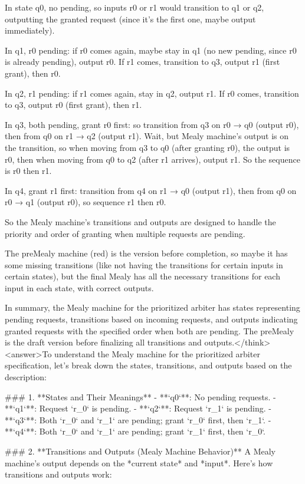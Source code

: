 In state q0, no pending, so inputs r0 or r1 would transition to q1 or q2, outputting the granted request (since it's the first one, maybe output immediately).

In q1, r0 pending: if r0 comes again, maybe stay in q1 (no new pending, since r0 is already pending), output r0. If r1 comes, transition to q3, output r1 (first grant), then r0.

In q2, r1 pending: if r1 comes again, stay in q2, output r1. If r0 comes, transition to q3, output r0 (first grant), then r1.

In q3, both pending, grant r0 first: so transition from q3 on r0 → q0 (output r0), then from q0 on r1 → q2 (output r1). Wait, but Mealy machine's output is on the transition, so when moving from q3 to q0 (after granting r0), the output is r0, then when moving from q0 to q2 (after r1 arrives), output r1. So the sequence is r0 then r1.

In q4, grant r1 first: transition from q4 on r1 → q0 (output r1), then from q0 on r0 → q1 (output r0), so sequence r1 then r0.

So the Mealy machine's transitions and outputs are designed to handle the priority and order of granting when multiple requests are pending.

The preMealy machine (red) is the version before completion, so maybe it has some missing transitions (like not having the transitions for certain inputs in certain states), but the final Mealy has all the necessary transitions for each input in each state, with correct outputs.

In summary, the Mealy machine for the prioritized arbiter has states representing pending requests, transitions based on incoming requests, and outputs indicating granted requests with the specified order when both are pending. The preMealy is the draft version before finalizing all transitions and outputs.</think><answer>To understand the Mealy machine for the prioritized arbiter specification, let’s break down the states, transitions, and outputs based on the description:  


### 1. **States and Their Meanings**  
- **`q0`**: No pending requests.  
- **`q1`**: Request `r_0` is pending.  
- **`q2`**: Request `r_1` is pending.  
- **`q3`**: Both `r_0` and `r_1` are pending; grant `r_0` first, then `r_1`.  
- **`q4`**: Both `r_0` and `r_1` are pending; grant `r_1` first, then `r_0`.    


### 2. **Transitions and Outputs (Mealy Machine Behavior)**  
A Mealy machine’s output depends on the *current state* and *input*. Here’s how transitions and outputs work:  

